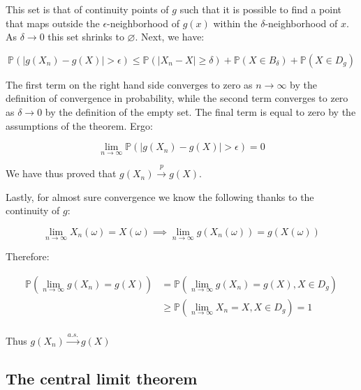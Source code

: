 \documentclass{report}
\begin{document}
This set is that of continuity points of $g$ such that it is possible to find a point that maps outside the $\epsilon$-neighborhood of $g(x)$ within the $\delta$-neighborhood of $x$. As $\delta \to 0$ this set shrinks to $\varnothing$. Next, we have:

\begin{equation}\label{eq:ex-lst-cmt-prob-proof-2}
    \mathbb{P}(|g(X_n) - g(X)| > \epsilon) \leq \mathbb{P}(|X_n - X| \geq \delta) + \mathbb{P}(X \in B_\delta) + \mathbb{P}(X \in D_g)
\end{equation}

The first term on the right hand side converges to zero as $n \to \infty$ by the definition of convergence in probability, while the second term converges to zero as $\delta \to 0$ by the definition of the empty set. The final term is equal to zero by the assumptions of the theorem. Ergo:

\begin{equation}\label{eq:ex-lst-cmt-prob-proof-3}
    \lim_{n \to \infty} \mathbb{P}(|g(X_n) - g(X)| > \epsilon) = 0
\end{equation}

We have thus proved that $g(X_n) \overset{p}{\to} g(X)$. 

Lastly, for almost sure convergence we know the following thanks to the continuity of $g$:

\begin{equation}\label{eq:ex-lst-cmt-as-proof-1}
    \lim_{n\to\infty} X_n(\omega) = X(\omega) \implies \lim_{n\to\infty} g(X_n(\omega)) = g(X(\omega))
\end{equation}

Therefore:

\begin{equation}\label{eq:ex-lst-cmt-as-proof-2}
    \begin{aligned}
        \mathbb{P}\left(\lim_{n\to\infty} g(X_n) = g(X)\right)
          &= \mathbb{P}\left(\lim_{n\to\infty} g(X_n) = g(X), X \in D_g\right) \\
          &\geq \mathbb{P}\left(\lim_{n\to\infty} X_n = X, X \in D_g\right) = 1 \\
    \end{aligned}
\end{equation}

Thus $g(X_n) \overset{a.s.}{\to} g(X)$

\subsection{The central limit theorem}
\end{document}
